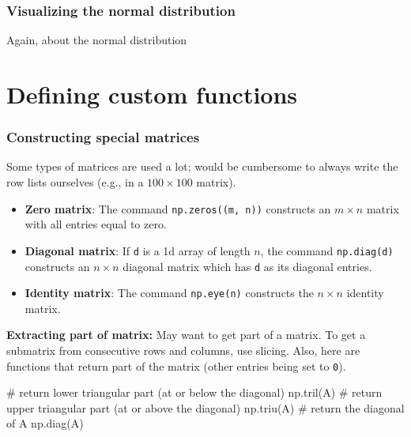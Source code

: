 \documentclass{beamer}
\newenvironment{codeblock}
    {\hfill\begin{beamerboxesrounded}[lower=codecol, width=0.8\textwidth]
    \medskip

    }
    { 
    \end{beamerboxesrounded}\hfill
    }
\theoremstyle{example}
\newcommand{\ttt}[1]{{\small\texttt{#1}}}
\begin{document}

\begin{frame}[fragile]
\frametitle{Visualizing the normal distribution}
    
Again, about the normal distribution
    
    
\end{frame}


    
\section{Defining custom functions}

\begin{frame}[fragile]
\frametitle{Constructing special matrices}
Some types of matrices are used a lot; would be cumbersome to always write the row lists ourselves (e.g., in a $100\times100$ matrix).
    
    \begin{itemize}
        \item[] \textbf{Zero matrix}: The command \ttt{np.zeros((m, n))} constructs an $m\times n$ matrix with all entries equal to zero.
        \item[] \textbf{Diagonal matrix}: If \ttt{d} is a 1d array of length $n$, the command \ttt{np.diag(d)} constructs an $n\times n$ diagonal matrix which has \ttt{d} as its diagonal entries.
        \item[] \textbf{Identity matrix}: The command \ttt{np.eye(n)} constructs the $n\times n$ identity matrix.
    \end{itemize}
    
\textbf{Extracting part of matrix:} May want to get part of a matrix. To get a submatrix from consecutive rows and columns, use slicing. %
Also, here are functions that return part of the matrix (other entries being set to \ttt{0}).%

\begin{codeblock}

\begin{python}
# return lower triangular part (at or below the diagonal)
np.tril(A)
# return upper triangular part (at or above the diagonal)
np.triu(A)
# return the diagonal of A
np.diag(A)
\end{python}

\end{codeblock}
\end{frame}
\end{document}
